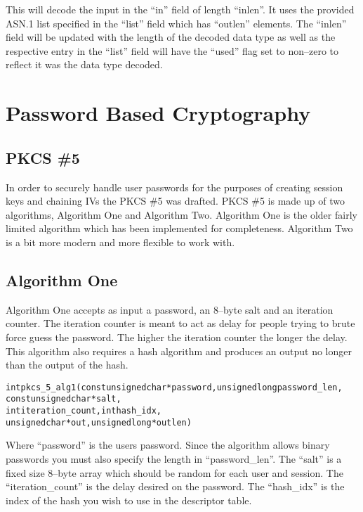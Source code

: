 \documentclass[a4paper]{book}
\begin{document}
This will decode the input in the ``in'' field of length ``inlen''.  It uses the provided ASN.1 list specified in the ``list'' field which has ``outlen'' elements.  
The ``inlen'' field will be updated with the length of the decoded data type as well as the respective entry in the ``list'' field will have the ``used'' flag 
set to non--zero to reflect it was the data type decoded.

\section{Password Based Cryptography}
\subsection{PKCS \#5}
In order to securely handle user passwords for the purposes of creating session keys and chaining IVs the PKCS \#5 was drafted.   PKCS \#5
is made up of two algorithms, Algorithm One and Algorithm Two.  Algorithm One is the older fairly limited algorithm which has been implemented
for completeness.  Algorithm Two is a bit more modern and more flexible to work with.

\subsection{Algorithm One}
Algorithm One accepts as input a password, an 8--byte salt and an iteration counter.  The iteration counter is meant to act as delay for
people trying to brute force guess the password.  The higher the iteration counter the longer the delay.  This algorithm also requires a hash 
algorithm and produces an output no longer than the output of the hash.  

\begin{alltt}
int pkcs_5_alg1(const unsigned char *password, unsigned long password_len, 
                const unsigned char *salt, 
                int iteration_count,  int hash_idx,
                unsigned char *out,   unsigned long *outlen)
\end{alltt}
Where ``password'' is the users password.  Since the algorithm allows binary passwords you must also specify the length in ``password\_len''.  
The ``salt'' is a fixed size 8--byte array which should be random for each user and session.  The ``iteration\_count'' is the delay desired
on the password.  The ``hash\_idx'' is the index of the hash you wish to use in the descriptor table.  
\end{document}
